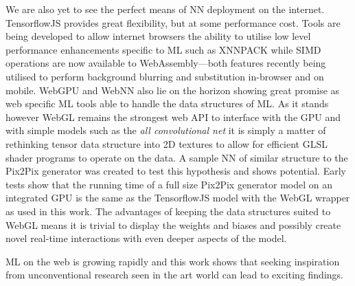 \documentclass{article}
\begin{document}
We are also yet to see the perfect means of NN deployment on the internet. TensorflowJS provides great flexibility, but at some performance cost. Tools are being developed to allow internet browsers the ability to utilise low level performance enhancements specific to ML such as XNNPACK\cite{XNNPACK} while SIMD operations are now available to WebAssembly\cite{SIMD}---both features recently being utilised to perform background blurring and substitution in-browser and on mobile\cite{google_background}. WebGPU\cite{webgpu} and WebNN\cite{webnn} also lie on the horizon showing great promise as web specific ML tools able to handle the data structures of ML\@. As it stands however WebGL remains the strongest web API to interface with the GPU and with simple models such as the \textit{all convolutional net} it is simply a matter of rethinking tensor data structure into 2D textures to allow for efficient GLSL shader programs to operate on the data. A sample NN of similar structure to the Pix2Pix generator was created to test this hypothesis and shows potential. Early tests show that the running time of a full size Pix2Pix generator model on an integrated GPU is the same as the TensorflowJS model with the WebGL wrapper as used in this work. The advantages of keeping the data structures suited to WebGL means it is trivial to display the weights and biases and possibly create novel real-time interactions with even deeper aspects of the model.

ML on the web is growing rapidly and this work shows that seeking inspiration from unconventional research seen in the art world can lead to exciting findings.


\medskip
\printbibliography
\end{document}
